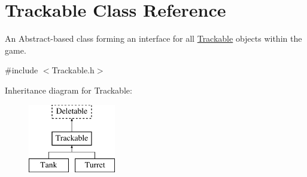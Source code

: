 \hypertarget{classTrackable}{\section{Trackable Class Reference}
\label{classTrackable}
}


An Abstract-\/based class forming an interface for all \hyperlink{classTrackable}{Trackable} objects within the game.  




{\ttfamily \#include $<$Trackable.\-h$>$}

Inheritance diagram for Trackable\-:\begin{figure}[H]
\begin{center}
\leavevmode
\includegraphics[height=3.000000cm]{classTrackable}
\end{center}
\end{figure}
